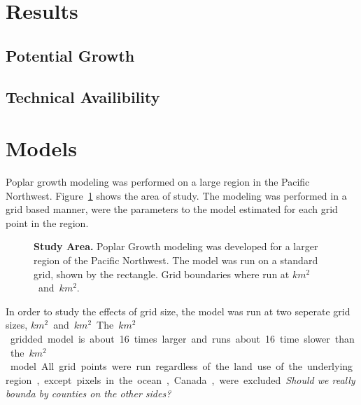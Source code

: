 \documentclass[10pt]{article}
\begin{document}
\section*{Results}
\subsection*{Potential Growth}
\subsection*{Technical Availibility}



\section*{Models}

Poplar growth modeling was performed on a large region in the Pacific
Northwest.  Figure~\ref{fig:study-area} shows the area of study.  The
modeling was performed in a grid based manner, were the parameters to
the model estimated for each grid point in the region.  

\begin{figure}[!ht]
\begin{center}
\vspace*{4cm}
\end{center}
\caption{ {\bf Study Area.}  Poplar Growth modeling was developed for
  a larger region of the Pacific Northwest.  The model was run on a
  standard grid, shown by the rectangle. Grid boundaries where run at
  \unit[2]{$km^2$} and \unit[8]{$km^2$}.  }
\label{fig:study-area}
\end{figure}

In order to study the effects of grid size, the model was run at two
seperate grid sizes, \unit[2]{$km^2$} and \unit[8]{$km^2$}.  The
\unit[2]{$km^2$} gridded model is about 16 times larger and runs about
16 time slower than the \unit[8]{$km^2$} model.  

All grid points were run regardless of the land use of the underlying
region, except pixels in the ocean, Canada, were excluded.
\emph{Should we really bounda by counties on the other sides? }
\end{document}
